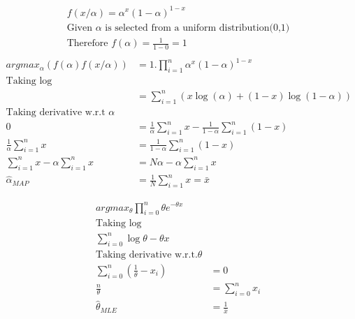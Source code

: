 \documentclass[12pt]{article}
\newenvironment{theorem}[2][Theorem]{\begin{trivlist}
\item[\hskip \labelsep {\bfseries #1}\hskip \labelsep {\bfseries #2.}]}{\end{trivlist}}
\begin{document}
\begin{theorem}[Ans]{1}
\begin{align*}
f(x/\alpha) = \alpha^{x}(1-\alpha)^{1-x} \\
\text{Given }\alpha \text{ is selected from a uniform distribution(0,1)}\\
\text{Therefore }f(\alpha) = \frac{1}{1-0} = 1\\
\end{align*}
\begin{align*}
    argmax_{\alpha}(f(\alpha)f(x/\alpha)) &= 1.\prod_{i=1}^{n}\alpha^{x}(1-\alpha)^{1-x}\\
    \text{Taking log}\\
    &= \sum_{i=1}^{n}(x\log(\alpha)+(1-x)\log(1-\alpha))\\
    \text{Taking derivative w.r.t }\alpha \\
    0 &= \frac{1}{\alpha}\sum_{i=1}^{n}x-\frac{1}{1-\alpha}\sum_{i=1}^{n}(1-x) \\
     \frac{1}{\alpha}\sum_{i=1}^{n}x &= \frac{1}{1-\alpha}\sum_{i=1}^{n}(1-x) \\
     \sum_{i=1}^{n}x - \alpha\sum_{i=1}^{n}x &= N\alpha - \alpha\sum_{i=1}^{n}x \\
     \hat{\alpha}_{MAP} &= \frac{1}{N}\sum_{i=1}^{n}x = \bar{x}
\end{align*}
\end{theorem}
\pagebreak
\begin{theorem}[Ans]{2}
\begin{align*}
argmax_{\theta}\prod_{i=0}^{n}\theta e^{-\theta x} \\
\text{Taking log} \\
\sum_{i=0}^{n}\log{\theta} - \theta x \\
\text{Taking derivative w.r.t.} \theta \\ 
\sum_{i=0}^{n}(\frac{1}{\theta}-x_{i}) &= 0\\
\frac{n}{\theta} &= \sum_{i=0}^{n}x_{i}\\
\hat{\theta}_{MLE} &= \frac{1}{\bar{x}}
\end{align*}
\end{theorem}
\end{document}
